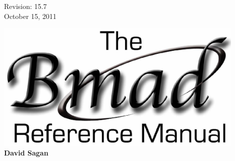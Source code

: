 \thispagestyle{empty}

\begin{flushright}
\large
  Revision: 15.7 \\
  October 15, 2011 \\
\end{flushright}

\vfill

{
\begin{center}
\includegraphics[width=12cm]{bmad-ref-manual.pdf} \\
\vskip 0.3in
\huge\bf David Sagan
\end{center}
}

\vfill
\break


